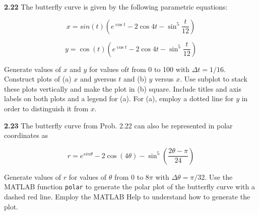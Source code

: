 \documentclass[../main.tex]{subfiles}
\begin{document}
\begin{multicols}{2}
\textbf{2.22} The butterfly curve is given by the following parametric equations:

$$x = sin(t)\left( e^{\cos t} - 2 \cos 4t - \sin^5 \dfrac{t}{12} \right)$$

$$y = \cos(t)\left( e^{\cos t} - 2 \cos 4t - \sin^5 \dfrac{t}{12} \right)$$

Generate values of $x$ and $y$ for values of$ t$ from 0 to 100 with
$\Delta t = 1/16$. Construct plots of (a) $x$ and $y $versus $t$ and (b) $y$
versus $x$. Use subplot to stack these plots vertically and
make the plot in (b) square. Include titles and axis labels on
both plots and a legend for (a). For (a), employ a dotted line
for $y$ in order to distinguish it from $x$.


\textbf{2.23} The butterfly curve from Prob. 2.22 can also be represented in polar coordinates as



$$r= e^{sin \theta}-2\cos(4\theta )- \sin^5 \left(\dfrac{2\theta - \pi }{24} \right) $$

Generate values of $r$ for values of $\theta$ from 0 to $8\pi$ with
$\Delta\theta = \pi/32$. Use the MATLAB function \texttt{polar} to generate
the polar plot of the butterfly curve with a dashed red line.
Employ the MATLAB Help to understand how to generate
the plot.



\end{multicols}
\end{document}
